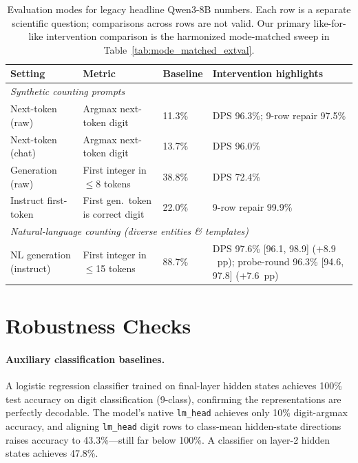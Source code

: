 \documentclass{article}
\begin{document}
\begin{table}[h]
\centering
\small
\caption{Evaluation modes for legacy headline Qwen3-8B numbers. Each row is a separate scientific question; comparisons across rows are not valid. Our primary like-for-like intervention comparison is the harmonized mode-matched sweep in Table~\ref{tab:mode_matched_extval}.}
\label{tab:eval_modes_legacy}
\begin{tabular}{p{2.5cm}p{2.9cm}p{2.1cm}p{4.1cm}}
\toprule
Setting & Metric & Baseline & Intervention highlights \\
\midrule
\multicolumn{4}{l}{\emph{Synthetic counting prompts}} \\
Next-token (raw) & Argmax next-token digit & 11.3\% & DPS 96.3\%; 9-row repair 97.5\% \\
Next-token (chat) & Argmax next-token digit & 13.7\% & DPS 96.0\% \\
Generation (raw) & First integer in $\leq$8 tokens & 38.8\% & DPS 72.4\% \\
Instruct first-token & First gen.\ token is correct digit & 22.0\% & 9-row repair 99.9\% \\
\midrule
\multicolumn{4}{l}{\emph{Natural-language counting (diverse entities \& templates)}} \\
NL generation (instruct) & First integer in $\leq$15 tokens & 88.7\% & DPS 97.6\% [96.1, 98.9] ($+8.9$~pp); probe-round 96.3\% [94.6, 97.8] ($+7.6$~pp) \\
\bottomrule
\end{tabular}
\end{table}

\section{Robustness Checks}
\label{sec:robustness_checks}

\paragraph{Auxiliary classification baselines.}
A logistic regression classifier trained on final-layer hidden states achieves 100\% test accuracy on digit classification (9-class),
confirming the representations are perfectly decodable.
The model's native \texttt{lm\_head} achieves only 10\% digit-argmax accuracy,
and aligning \texttt{lm\_head} digit rows to class-mean hidden-state directions raises accuracy
to 43.3\%---still far below 100\%.
A classifier on layer-2 hidden states achieves 47.8\%.
\end{document}

